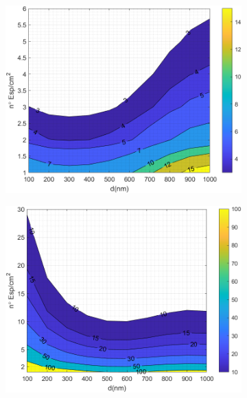 \begin{figure}[H]
	\centering
	\begin{subfigure}[b]{0.49\textwidth}
		\centering
		\includegraphics[width=1.00\textwidth]{figuras/Resultados/RelacionCondRad/SiGe.png}
		\caption{ }
		\label{fig:rel_SiSiO2Ge}
	\end{subfigure}
	\hfill
	\begin{subfigure}[b]{0.49\textwidth}
			\centering
			\includegraphics[width=1.00\textwidth]{figuras/Resultados/RelacionCondRad/SiGe_Rc.png}
			\caption{ }
			\label{fig:rel_SiSiO2Ge_Rc}
		\end{subfigure}

\end{figure}

